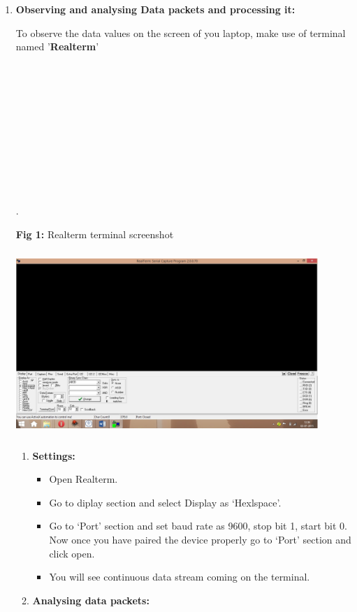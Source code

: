 \documentclass[12pt]{article}
\begin{document}
\begin{enumerate}
	\item \textbf{{\large Observing and analysing Data packets and processing it:
			}}


To observe the data values on the screen of you laptop, make use of terminal named '\textbf{Realterm}'\\\\\\\\\\\\\\\\\\\\\\\\.

\begin{center}
\textbf{Fig 1: }Realterm terminal screenshot
	\graphicspath{ {images/} }
	\includegraphics[width=11.5cm, height=7cm]{Realterm}
\end{center}
\begin{enumerate}
	\item \textbf{Settings:}

\begin{itemize}
	\item Open Realterm.
	\item Go to diplay section and select Display as `Hexlspace'.
	\item Go to ‘Port’ section and set baud rate as 9600, stop bit 1, start bit 0. Now once you have paired the device properly go to ‘Port’ section and click open. 
	\item You will see continuous data stream coming on the terminal.
\end{itemize}


	\item \textbf{Analysing data packets:}



\end{enumerate}
\end{enumerate}
\end{document}
